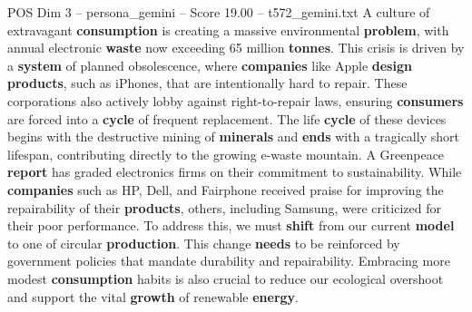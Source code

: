 \begin{textsample}{POS Dim 3 – persona\_gemini – Score 19.00 – t572\_gemini.txt}  \label{ex:f3_pos_042}
A culture of extravagant \textbf{consumption} is creating a massive environmental \textbf{problem}, with annual electronic \textbf{waste} now exceeding 65 million \textbf{tonnes}.
This crisis is driven by a \textbf{system} of planned obsolescence, where \textbf{companies} like Apple \textbf{design} \textbf{products}, such as iPhones, that are intentionally hard to repair.
These corporations also actively lobby against right-to-repair laws, ensuring \textbf{consumers} are forced into a \textbf{cycle} of frequent replacement.
The life \textbf{cycle} of these devices begins with the destructive mining of \textbf{minerals} and \textbf{ends} with a tragically short lifespan, contributing directly to the growing e-waste mountain.
A Greenpeace \textbf{report} has graded electronics firms on their commitment to sustainability.
While \textbf{companies} such as HP, Dell, and Fairphone received praise for improving the repairability of their \textbf{products}, others, including Samsung, were criticized for their poor performance.
To address this, we must \textbf{shift} from our current \textbf{model} to one of circular \textbf{production}.
This change \textbf{needs} to be reinforced by government policies that mandate durability and repairability.
Embracing more modest \textbf{consumption} habits is also crucial to reduce our ecological overshoot and support the vital \textbf{growth} of renewable \textbf{energy}.

\end{textsample}
